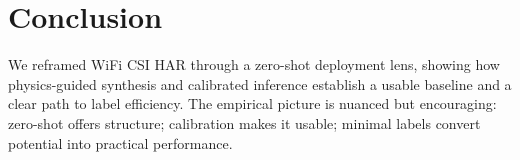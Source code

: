 \documentclass[journal]{IEEEtran}
\begin{document}
\section{Conclusion}
We reframed WiFi CSI HAR through a zero-shot deployment lens, showing how physics-guided synthesis and calibrated inference establish a usable baseline and a clear path to label efficiency. The empirical picture is nuanced but encouraging: zero-shot offers structure; calibration makes it usable; minimal labels convert potential into practical performance.



\end{document}
